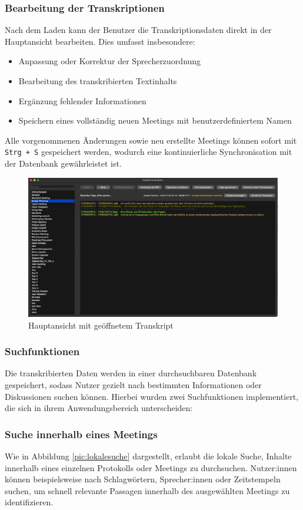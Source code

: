 \subsubsection{Bearbeitung der Transkriptionen}
Nach dem Laden kann der Benutzer die Transkriptionsdaten direkt in der Hauptansicht bearbeiten.
Dies umfasst insbesondere:
\begin{itemize}
    \item Anpassung oder Korrektur der Sprecherzuordnung
    \item Bearbeitung des transkribierten Textinhalts
    \item Ergänzung fehlender Informationen
    \item Speichern eines vollständig neuen Meetings mit benutzerdefiniertem Namen
\end{itemize}
Alle vorgenommenen Änderungen sowie neu erstellte Meetings können sofort mit \texttt{Strg + S} gespeichert werden, wodurch eine kontinuierliche Synchronisation mit der Datenbank gewährleistet ist.
\clearpage 
\begin{figure}[h!]
    \centering
    \includegraphics[width=0.7\linewidth]{Bilder/hauptansicht.png}
    \caption{Hauptansicht mit geöffnetem Transkript}
    \label{fig:hauptansicht}
\end{figure}

\subsubsection{Suchfunktionen}
\label{sec:protokolsuche}
Die transkribierten Daten werden in einer durchsuchbaren Datenbank gespeichert,
sodass Nutzer gezielt nach bestimmten Informationen oder Diskussionen suchen
können. Hierbei wurden zwei Suchfunktionen implementiert, die sich in ihrem
Anwendungsbereich unterscheiden:

\subsubsection*{Suche innerhalb eines Meetings}
\label{sub:lokalesuche}
Wie in Abbildung \autoref{pic:lokalesuche} dargestellt, erlaubt die lokale Suche,
Inhalte innerhalb eines einzelnen Protokolls oder Meetings zu durchsuchen.
Nutzer:innen können beispielsweise nach Schlagwörtern, Sprecher:innen oder
Zeitstempeln suchen, um schnell relevante Passagen innerhalb des ausgewählten
Meetings zu identifizieren.


